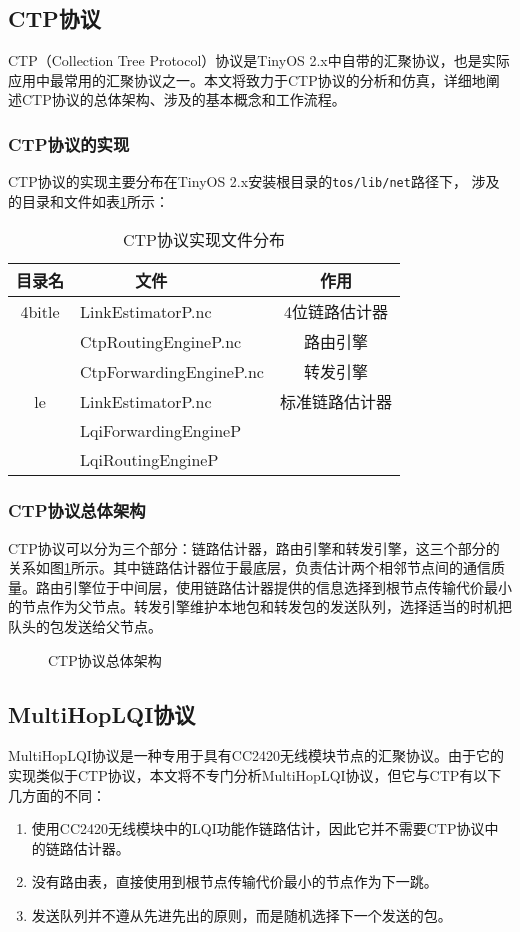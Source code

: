 \subsection{CTP协议}
CTP（Collection Tree Protocol）协议是TinyOS 2.x中自带的汇聚协议，也是实际应用中最常用的汇聚协议之一。本文将致力于CTP协议的分析和仿真，详细地阐述CTP协议的总体架构、涉及的基本概念和工作流程。

\subsubsection{CTP协议的实现}
CTP协议的实现主要分布在TinyOS 2.x安装根目录的\texttt{tos/lib/net}路径下，
涉及的目录和文件如表\ref{ctp-files}所示：
\begin{table}[ht]
\caption{\hei CTP协议实现文件分布}\label{ctp-files}
\vspace{-5pt}
\begin{center}
\begin{tabular}{|c|l|c|}
\hline
目录名&~~~~~~文件&作用 \\
\hline
4bitle&LinkEstimatorP.nc&4位链路估计器 \\
\hline
\raisebox{-5pt}{ctp}&CtpRoutingEngineP.nc&路由引擎 \\
&CtpForwardingEngineP.nc&转发引擎 \\
\hline
le&LinkEstimatorP.nc&标准链路估计器 \\
\hline
\raisebox{-5pt}{lqi}&LqiForwardingEngineP&\raisebox{-5pt}{MultiHopLQI协议} \\
&LqiRoutingEngineP&\\
\hline
\end{tabular}
\end{center}
\end{table}

\subsubsection{CTP协议总体架构}
CTP协议可以分为三个部分：链路估计器，路由引擎和转发引擎，这三个部分的关系如图\ref{ctp-structure}所示。其中链路估计器位于最底层，负责估计两个相邻节点间的通信质量。路由引擎位于中间层，使用链路估计器提供的信息选择到根节点传输代价最小的节点作为父节点。转发引擎维护本地包和转发包的发送队列，选择适当的时机把队头的包发送给父节点。

\begin{figure}[ht]
\centering

\caption{CTP协议总体架构}\label{ctp-structure}
\end{figure}

\subsection{MultiHopLQI协议}
MultiHopLQI协议是一种专用于具有CC2420无线模块节点的汇聚协议。由于它的实现类似于CTP协议，本文将不专门分析MultiHopLQI协议，但它与CTP有以下几方面的不同：
\vspace{-10pt}
\begin{enumerate}
	\item 使用CC2420无线模块中的LQI功能作链路估计，因此它并不需要CTP协议中的链路估计器。
	\item 没有路由表，直接使用到根节点传输代价最小的节点作为下一跳。
	\item 发送队列并不遵从先进先出的原则，而是随机选择下一个发送的包。
\end{enumerate}
